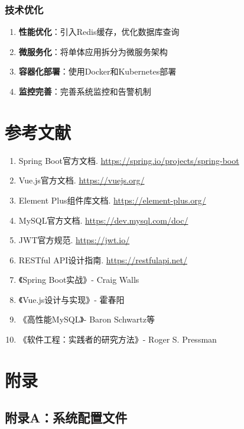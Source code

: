 \documentclass[12pt,a4paper]{article}
\begin{document}
\subsubsection{技术优化}
\begin{enumerate}
    \item \textbf{性能优化}：引入Redis缓存，优化数据库查询
    \item \textbf{微服务化}：将单体应用拆分为微服务架构
    \item \textbf{容器化部署}：使用Docker和Kubernetes部署
    \item \textbf{监控完善}：完善系统监控和告警机制
\end{enumerate}

\section{参考文献}

\begin{enumerate}
    \item Spring Boot官方文档. \url{https://spring.io/projects/spring-boot}
    \item Vue.js官方文档. \url{https://vuejs.org/}
    \item Element Plus组件库文档. \url{https://element-plus.org/}
    \item MySQL官方文档. \url{https://dev.mysql.com/doc/}
    \item JWT官方规范. \url{https://jwt.io/}
    \item RESTful API设计指南. \url{https://restfulapi.net/}
    \item 《Spring Boot实战》- Craig Walls
    \item 《Vue.js设计与实现》- 霍春阳
    \item 《高性能MySQL》- Baron Schwartz等
    \item 《软件工程：实践者的研究方法》- Roger S. Pressman
\end{enumerate}

\section*{附录}

\subsection*{附录A：系统配置文件}
\end{document}
